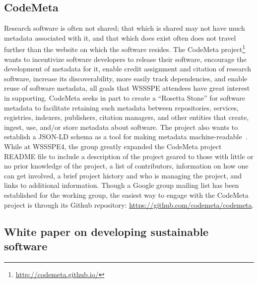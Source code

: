 \documentclass[11pt, oneside]{amsart}
\newcommand{\note}[1]{ {\textcolor{blueish}    { ***Note:      #1 }}}
\begin{document}
\subsection{CodeMeta}
\label{sec:CodeMeta}


Research software is often not shared; that which is shared may not have much metadata associated with it, and that which does exist often does not travel further than the website on which the software resides. The CodeMeta project\footnote{\url{http://codemeta.github.io/}} wants to incentivize software developers to release their software, encourage the development of metadata for it, enable credit assignment and citation of research software, increase its discoverability, more easily track dependencies, and enable reuse of software metadata, all goals that WSSSPE attendees have great interest in supporting.  
%
CodeMeta seeks in part to create a ``Rosetta Stone'' for software metadata to facilitate retaining such metadata between repositories, services, registries, indexers, publishers, citation managers, and other entities that create, ingest, use, and/or store metadata about software. The project also wants to establish a JSON-LD schema as a tool for making metadata machine-readable~\cite{CodeMeta_schema}.
% 
While at WSSSPE4, the group greatly expanded the CodeMeta project README file to include a description of the project geared to those with little or no prior knowledge of the project, a list of contributors, information on how one can get involved, a brief project history and who is managing the project, and links to additional information.
%
Though a Google group mailing list has been established for the working group, the easiest way to engage with the CodeMeta project is through its Github repository: \url{https://github.com/codemeta/codemeta}.


\subsection{White paper on developing sustainable software}
\label{sec:best-practices-developing}

\end{document}
